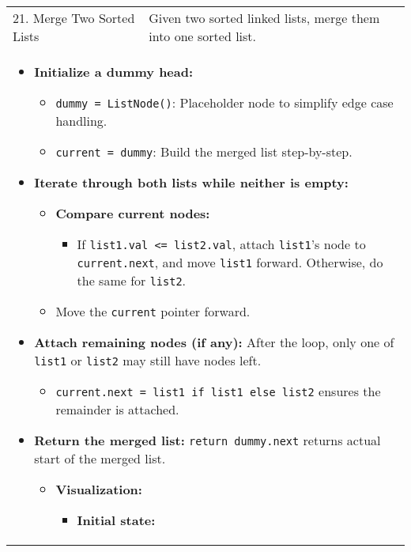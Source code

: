 \begin{summary}
\begin{center}
\begin{tabular}{ll}
                \midrule
                21. Merge Two Sorted Lists & Given two sorted linked lists, merge them into one sorted list. \\
                \multicolumn{2}{p{\linewidth}}{
                    \begin{itemize}
                        \item \textbf{Initialize a dummy head:} 
                        \begin{itemize}
                            \item \texttt{dummy = ListNode()}: Placeholder node to simplify edge case handling. 
                            \item \texttt{current = dummy}: Build the merged list step-by-step.
                        \end{itemize}
                    
                        \item \textbf{Iterate through both lists while neither is empty:} 
                        \begin{itemize}
                            \item \textbf{Compare current nodes:}
                            \begin{itemize}
                                \item If \texttt{list1.val <= list2.val}, attach \texttt{list1}'s node to \texttt{current.next}, and move \texttt{list1} forward. Otherwise, do the same for \texttt{list2}.
                            \end{itemize}
                            \item Move the \texttt{current} pointer forward.
                        \end{itemize}
                    
                        \item \textbf{Attach remaining nodes (if any):} After the loop, only one of \texttt{list1} or \texttt{list2} may still have nodes left. 
                        \begin{itemize}
                            \item \texttt{current.next = list1 if list1 else list2} ensures the remainder is attached.
                        \end{itemize}
                    
                        \item \textbf{Return the merged list:} \texttt{return dummy.next} returns actual start of the merged list.
                        \begin{itemize}
                        \item \textbf{Visualization:}
                        \begin{itemize}
                            \item \textbf{Initial state:}
                            

\end{itemize}
\end{itemize}
\end{itemize}}
\end{tabular}
\end{center}
\end{summary}
